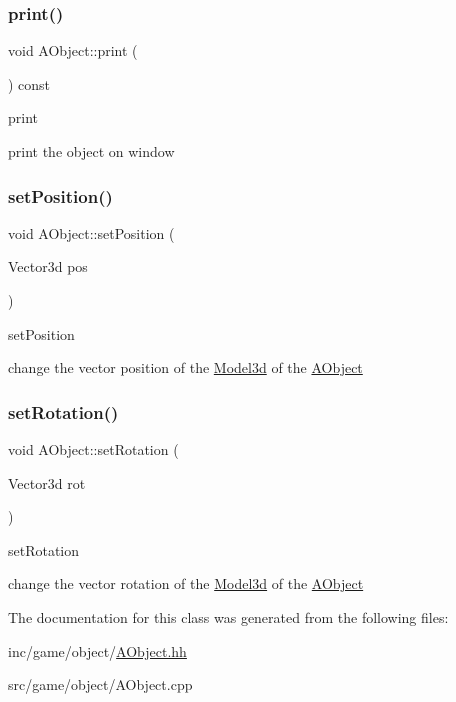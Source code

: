 \subsubsection{\texorpdfstring{print()}{print()}}
{\footnotesize\ttfamily void A\+Object\+::print (\begin{DoxyParamCaption}{ }\end{DoxyParamCaption}) const}



print 

print the object on window \mbox{\label{classAObject_ab4a2dc3dad1a54ff80d59c42a51479fb}} 
\subsubsection{\texorpdfstring{set\+Position()}{setPosition()}}
{\footnotesize\ttfamily void A\+Object\+::set\+Position (\begin{DoxyParamCaption}\item[{Vector3d}]{pos }\end{DoxyParamCaption})}



set\+Position 

change the vector position of the \hyperlink{classModel3d}{Model3d} of the \hyperlink{classAObject}{A\+Object} \mbox{\label{classAObject_a38ba628dcec6be910ce9d3c9f0de0de7}} 
\subsubsection{\texorpdfstring{set\+Rotation()}{setRotation()}}
{\footnotesize\ttfamily void A\+Object\+::set\+Rotation (\begin{DoxyParamCaption}\item[{Vector3d}]{rot }\end{DoxyParamCaption})}



set\+Rotation 

change the vector rotation of the \hyperlink{classModel3d}{Model3d} of the \hyperlink{classAObject}{A\+Object} 

The documentation for this class was generated from the following files\+:\begin{DoxyCompactItemize}
\item 
inc/game/object/\hyperlink{AObject_8hh}{A\+Object.\+hh}\item 
src/game/object/A\+Object.\+cpp\end{DoxyCompactItemize}
